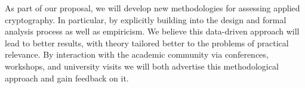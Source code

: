 As part of our proposal, we will develop new methodologies for assessing applied
cryptography. In particular, by explicitly building into the design and formal
analysis process as well as empiricism. We believe this data-driven approach
will lead to better results, with theory tailored better to  the problems of
practical relevance. By interaction with the academic community via conferences,
workshops, and university visits we will both advertise this methodological
approach and gain feedback on it. 




%

